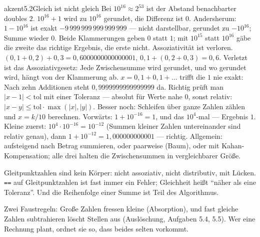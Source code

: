 \begin{loesungkarte}{akzent}{5.2}{Gleich ist nicht gleich}
Bei $10^{16}\approx2^{53}$ ist der Abstand benachbarter doubles $2$. $10^{16} + 1$ wird zu $10^{16}$ gerundet, die Differenz ist $0$. Andersherum: $1 - 10^{16}$ ist exakt $-9\,999\,999\,999\,999\,999$ --- nicht darstellbar, gerundet zu $-10^{16}$; Summe wieder $0$. Beide Klammerungen geben $0$ statt $1$; mit $10^{15}$ statt $10^{16}$ gäbe die zweite das richtige Ergebnis, die erste nicht. Assoziativität ist verloren.
$(0{,}1 + 0{,}2) + 0{,}3 = 0{,}6000000000000001$, $0{,}1 + (0{,}2 + 0{,}3) = 0{,}6$. Verletzt ist das Assoziativgesetz: Jede Zwischensumme wird gerundet, und wo gerundet wird, hängt von der Klammerung ab.
$x = 0{,}1 + 0{,}1 + \dots$ trifft die $1$ nie exakt: Nach zehn Additionen steht $0{,}9999999999999999$ da. Richtig prüft man $|x - 1| < \text{tol}$ mit einer Toleranz --- absolut für Werte nahe $0$, sonst relativ: $|x - y|\le\text{tol}\cdot\max(|x|, |y|)$. Besser noch: Schleifen über ganze Zahlen zählen und $x = k/10$ berechnen.
Vorwärts: $1 + 10^{-16} = 1$, und das $10^{4}$-mal --- Ergebnis $1$. Kleine zuerst: $10^{4}\cdot10^{-16} = 10^{-12}$ (Summen kleiner Zahlen untereinander sind relativ genau), dann $1 + 10^{-12} = 1{,}000000000001$ --- richtig. Allgemein: aufsteigend nach Betrag summieren, oder paarweise (Baum), oder mit Kahan-Kompensation; alle drei halten die Zwischensummen in vergleichbarer Größe.
\begin{fehler}\kastentext
Gleitpunktzahlen sind kein Körper: nicht assoziativ, nicht distributiv, mit Lücken. \texttt{==} auf Gleitpunktzahlen ist fast immer ein Fehler; Gleichheit heißt \enquote{näher als eine Toleranz}. Und die Reihenfolge einer Summe ist Teil des Algorithmus.
\end{fehler}
\begin{mitnehmen}\kastentext
Zwei Faustregeln: Große Zahlen fressen kleine (Absorption), und fast gleiche Zahlen subtrahieren löscht Stellen aus (Auslöschung, Aufgaben 5.4, 5.5). Wer eine Rechnung plant, ordnet sie so, dass beides selten vorkommt.
\end{mitnehmen}
\end{loesungkarte}

